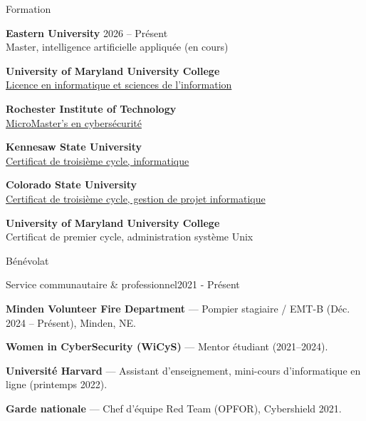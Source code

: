 \documentclass{resume} %
\begin{document}
\begin{rSection}{Formation}

{\bf Eastern University} \hfill {2026 -- Pr\'esent} \\
Master, intelligence artificielle appliqu\'ee (en cours)

{\bf University of Maryland University College} \\
\href{https://github.com/CryptoJones/cv/raw/master/UMUC_UNDERGRAD_DIPLOMA.jpg}{Licence en informatique et sciences de l'information}

{\bf Rochester Institute of Technology} \\
\href{https://raw.githubusercontent.com/CryptoJones/cv/master/RIT_MMM.pdf}{MicroMaster's en cybers\'ecurit\'e}

{\bf Kennesaw State University} \\
\href{https://raw.githubusercontent.com/CryptoJones/cv/master/KSU_GRADCERT_CSF.jpg}{Certificat de troisi\`eme cycle, informatique}

{\bf Colorado State University} \\
\href{https://raw.githubusercontent.com/CryptoJones/cv/master/CSU_GRADCERT_ITPM.jpg}{Certificat de troisi\`eme cycle, gestion de projet informatique}

{\bf University of Maryland University College} \\
Certificat de premier cycle, administration syst\`eme Unix

\end{rSection}



\begin{rSection}{B\'en\'evolat}

\begin{rSubsection}{Service communautaire \& professionnel}{2021 - Pr\'esent}{}{}
\item {\bf Minden Volunteer Fire Department} --- Pompier stagiaire / EMT-B (D\'ec. 2024 -- Pr\'esent), Minden, NE.
\item {\bf Women in CyberSecurity (WiCyS)} --- Mentor \'etudiant (2021--2024).
\item {\bf Universit\'e Harvard} --- Assistant d'enseignement, mini-cours d'informatique en ligne (printemps 2022).
\item {\bf Garde nationale} --- Chef d'\'equipe Red Team (OPFOR), Cybershield 2021.
\end{rSubsection}

\end{rSection}
\end{document}
